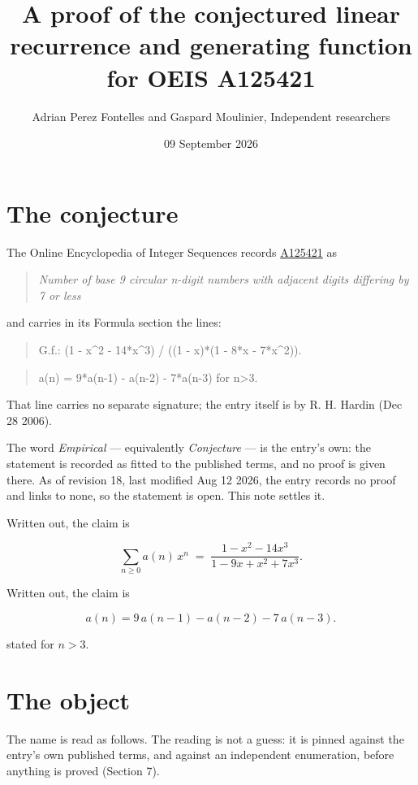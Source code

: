 \documentclass[11pt]{article}
\title{A proof of the conjectured linear recurrence and generating function for OEIS A125421}
\author{Adrian Perez Fontelles and Gaspard Moulinier, Independent researchers}
\date{09 September 2026}
\theoremstyle{definition}
\begin{document}
\maketitle
\section{The conjecture}

The Online Encyclopedia of Integer Sequences records \href{https://oeis.org/A125421}{A125421} as

\begin{quote}\itshape Number of base 9 circular n-digit numbers with adjacent digits differing by 7 or less\end{quote}

and carries in its Formula section the lines:

\begin{quote}\ttfamily G.f.: (1 - x\textasciicircum{}2 - 14*x\textasciicircum{}3) / ((1 - x)*(1 - 8*x - 7*x\textasciicircum{}2)).\end{quote}

\begin{quote}\ttfamily a(n) = 9*a(n-1) - a(n-2) - 7*a(n-3) for n>3.\end{quote}

That line carries no separate signature; the entry itself is by R. H. Hardin (Dec 28 2006).

The word {\itshape Empirical} --- equivalently {\itshape Conjecture} --- is the entry's own: the statement is recorded as fitted to the published terms, and no proof is given there. As of revision 18, last modified Aug 12 2026, the entry records no proof and links to none, so the statement is open. This note settles it.

Written out, the claim is

\[\sum_{n \ge 0} a(n)\,x^n \;=\; \frac{1 - x^{2} - 14x^{3}}{1 - 9x + x^{2} + 7x^{3}}.\]

Written out, the claim is

\[a(n) = 9\,a(n-1) - a(n-2) - 7\,a(n-3).\]

stated for $n > 3$.

\section{The object}

The name is read as follows. The reading is not a guess: it is pinned against the entry's own published terms, and against an independent enumeration, before anything is proved (Section 7).
\end{document}
